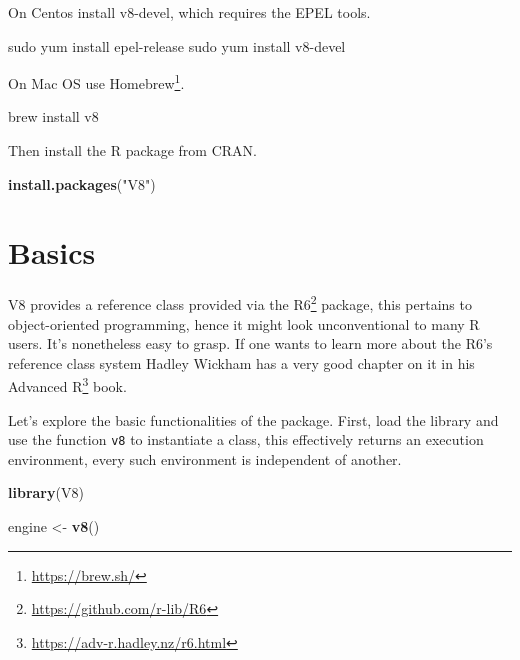 \documentclass[
]{krantz}
\makeatletter
\newenvironment{Shaded}{\begin{snugshade}}{\end{snugshade}}
\newcommand{\ExtensionTok}[1]{#1}
\newcommand{\FunctionTok}[1]{\textcolor[rgb]{0,0,0}{#1}}
\newcommand{\KeywordTok}[1]{\textcolor[rgb]{0.27,0.27,0.27}{\textbf{#1}}}
\newcommand{\NormalTok}[1]{#1}
\newcommand{\StringTok}[1]{\textcolor[rgb]{0.5,0.5,0.5}{#1}}
\renewcommand{\href}[2]{#2\footnote{\url{#1}}}
\newenvironment{kframe}{%
\medskip{}
\setlength{\fboxsep}{.8em}
 \def\at@end@of@kframe{}%
 \ifinner\ifhmode%
  \def\at@end@of@kframe{\end{minipage}}%
  \begin{minipage}{\columnwidth}%
 \fi\fi%
 \def\FrameCommand##1{\hskip\@totalleftmargin \hskip-\fboxsep
 \colorbox{shadecolor}{##1}\hskip-\fboxsep
     \hskip-\linewidth \hskip-\@totalleftmargin \hskip\columnwidth}%
 \MakeFramed {\advance\hsize-\width
   \@totalleftmargin\z@ \linewidth\hsize
   \@setminipage}}%
 {\par\unskip\endMakeFramed%
 \at@end@of@kframe}
\renewenvironment{Shaded}{\begin{kframe}}{\end{kframe}}
\makeatother
\begin{document}
On Centos install v8-devel, which requires the EPEL tools.

\begin{Shaded}
\begin{Highlighting}[]
\FunctionTok{sudo}\NormalTok{ yum install epel{-}release}
\FunctionTok{sudo}\NormalTok{ yum install v8{-}devel}
\end{Highlighting}
\end{Shaded}

On Mac OS use \href{https://brew.sh/}{Homebrew}.

\begin{Shaded}
\begin{Highlighting}[]
\ExtensionTok{brew}\NormalTok{ install v8}
\end{Highlighting}
\end{Shaded}

Then install the R package from CRAN.

\begin{Shaded}
\begin{Highlighting}[]
\KeywordTok{install.packages}\NormalTok{(}\StringTok{"V8"}\NormalTok{)}
\end{Highlighting}
\end{Shaded}

\hypertarget{v8-basics}{%
\section{Basics}\label{v8-basics}}

V8 provides a reference class provided via the \href{https://github.com/r-lib/R6}{R6} \citep{R-R6} package, this pertains to object-oriented programming, hence it might look unconventional to many R users. It's nonetheless easy to grasp. If one wants to learn more about the R6's reference class system Hadley Wickham has a very good chapter on it in his \href{https://adv-r.hadley.nz/r6.html}{Advanced R} book.

Let's explore the basic functionalities of the package. First, load the library and use the function \texttt{v8} to instantiate a class, this effectively returns an execution environment, every such environment is independent of another.

\begin{Shaded}
\begin{Highlighting}[]
\KeywordTok{library}\NormalTok{(V8)}

\NormalTok{engine <{-}}\StringTok{ }\KeywordTok{v8}\NormalTok{()}
\end{Highlighting}
\end{Shaded}
\end{document}
